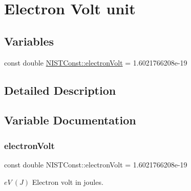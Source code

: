 \hypertarget{group___electron_volt_unit}{}\section{Electron Volt unit}
\label{group___electron_volt_unit}
\subsection*{Variables}
\begin{DoxyCompactItemize}
\item 
const double \hyperlink{group___electron_volt_unit_ga24c6771adb5c4de68575b1a77f0b2415}{N\+I\+S\+T\+Const\+::electron\+Volt} = 1.\+6021766208e-\/19
\end{DoxyCompactItemize}


\subsection{Detailed Description}


\subsection{Variable Documentation}
\mbox{\label{group___electron_volt_unit_ga24c6771adb5c4de68575b1a77f0b2415}} 
\subsubsection{\texorpdfstring{electron\+Volt}{electronVolt}}
{\footnotesize\ttfamily const double N\+I\+S\+T\+Const\+::electron\+Volt = 1.\+6021766208e-\/19}

$eV \ (J)$ Electron volt in joules. 